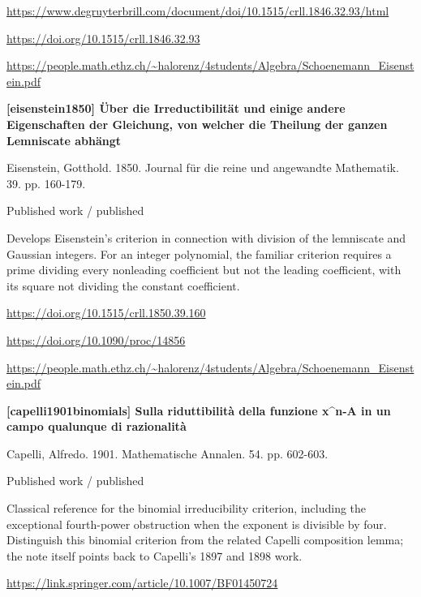 \documentclass[11pt,a4paper,oneside,openany]{book}
\begin{document}
{\footnotesize\url{https://www.degruyterbrill.com/document/doi/10.1515/crll.1846.32.93/html}}\par
{\footnotesize\url{https://doi.org/10.1515/crll.1846.32.93}}\par
{\footnotesize\url{https://people.math.ethz.ch/~halorenz/4students/Algebra/Schoenemann_Eisenstein.pdf}}\par
\vspace{9pt}
\hypertarget{ref:eisenstein1850}{}
{\sffamily\bfseries\color{atlasgreen}[eisenstein1850] Über die Irreductibilität und einige andere Eigenschaften der Gleichung, von welcher die Theilung der ganzen Lemniscate abhängt}\par
\color{black} Eisenstein, Gotthold. 1850. Journal für die reine und angewandte Mathematik. 39. pp. 160-179.\par
{\small\sffamily\color{atlasgold}Published work / published}\par
\color{black} Develops Eisenstein's criterion in connection with division of the lemniscate and Gaussian integers. For an integer polynomial, the familiar criterion requires a prime dividing every nonleading coefficient but not the leading coefficient, with its square not dividing the constant coefficient.\par
{\footnotesize\url{https://doi.org/10.1515/crll.1850.39.160}}\par
{\footnotesize\url{https://doi.org/10.1090/proc/14856}}\par
{\footnotesize\url{https://people.math.ethz.ch/~halorenz/4students/Algebra/Schoenemann_Eisenstein.pdf}}\par
\vspace{9pt}
\hypertarget{ref:capelli1901binomials}{}
{\sffamily\bfseries\color{atlasgreen}[capelli1901binomials] Sulla riduttibilità della funzione x\textasciicircum{}n-A in un campo qualunque di razionalità}\par
\color{black} Capelli, Alfredo. 1901. Mathematische Annalen. 54. pp. 602-603.\par
{\small\sffamily\color{atlasgold}Published work / published}\par
\color{black} Classical reference for the binomial irreducibility criterion, including the exceptional fourth-power obstruction when the exponent is divisible by four. Distinguish this binomial criterion from the related Capelli composition lemma; the note itself points back to Capelli's 1897 and 1898 work.\par
{\footnotesize\url{https://link.springer.com/article/10.1007/BF01450724}}\par
\end{document}
